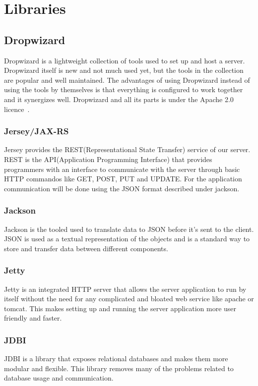 \section{Libraries}

\subsection{Dropwizard}
Dropwizard is a lightweight collection of tools used to set up and host a server. Dropwizard itself is new and not much used yet, but the tools in the collection are popular and well maintained. The advantages of using Dropwizard instead of using the tools by themselves is that everything is configured to work together and it synergizes well.
Dropwizard and all its parts is under the Apache 2.0 licence~\cite{apache}. 

\subsubsection{Jersey/JAX-RS}
Jersey provides the REST(Representational State Transfer) service of our server. REST is the API(Application Programming Interface) that provides programmers with an interface to communicate with the server through basic HTTP commandos like GET, POST, PUT and UPDATE. For the application communication will be done using the JSON format described under jackson.

\subsubsection{Jackson}
Jackson is the tooled used to translate data to JSON before it’s sent to the client. JSON is used as a textual representation of the objects and is a standard way to store and transfer data between different components.

\subsubsection{Jetty}
Jetty is an integrated HTTP server that allows the server application to run by itself without the need for any  complicated and bloated web service like apache or tomcat. This makes setting up and running the server application more user friendly and faster.

\subsubsection{JDBI}
JDBI is a library that exposes relational databases and makes them more modular and flexible. This library removes many of the problems related to database usage and communication.

